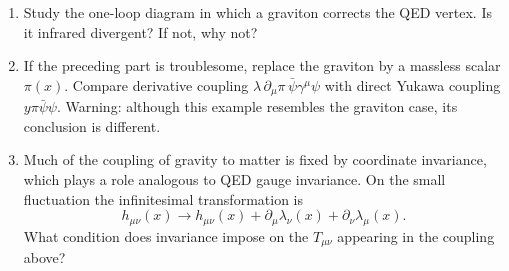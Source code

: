 \begin{enumerate}
\begin{enumerate}
the cross section.  Hint: use dimensional analysis.
\item
Study the one-loop diagram in which a graviton corrects the QED vertex.
Is it infrared divergent?  If not, why not?
\item
If the preceding part is troublesome, replace the graviton by a massless
scalar \(\pi(x)\).  Compare derivative coupling
\(\lambda\,\partial_\mu\pi\,\bar\psi\gamma^\mu\psi\) with direct Yukawa
coupling \(y\pi\bar\psi\psi\).  Warning: although this example resembles
the graviton case, its conclusion is different.
\item
Much of the coupling of gravity to matter is fixed by coordinate
invariance, which plays a role analogous to QED gauge invariance.  On the
small fluctuation the infinitesimal transformation is
\[
 h_{\mu\nu}(x)\longrightarrow h_{\mu\nu}(x)
 +\partial_\mu\lambda_\nu(x)+\partial_\nu\lambda_\mu(x).
\]
What condition does invariance impose on the \(T_{\mu\nu}\) appearing in
the coupling above?
\end{enumerate}
\end{enumerate}
